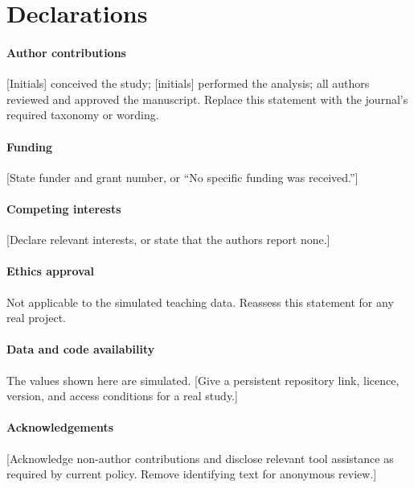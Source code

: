 \section*{Declarations}

\paragraph{Author contributions}
[Initials] conceived the study; [initials] performed the analysis; all authors
reviewed and approved the manuscript. Replace this statement with the journal's
required taxonomy or wording.

\paragraph{Funding}
[State funder and grant number, or ``No specific funding was received.'']

\paragraph{Competing interests}
[Declare relevant interests, or state that the authors report none.]

\paragraph{Ethics approval}
Not applicable to the simulated teaching data. Reassess this statement for any
real project.

\paragraph{Data and code availability}
The values shown here are simulated. [Give a persistent repository link,
licence, version, and access conditions for a real study.]

\paragraph{Acknowledgements}
[Acknowledge non-author contributions and disclose relevant tool assistance as
required by current policy. Remove identifying text for anonymous review.]
